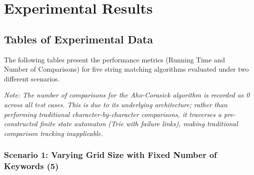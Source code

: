 \section[Experimental Results]{Experimental Results}

\subsection[Experimental Data]{Tables of Experimental Data}
The following tables present the performance metrics (Running Time and Number of Comparisons) for five string matching algorithms evaluated under two different scenarios. 

\vspace{0.3cm}
\noindent\textit{Note: The number of comparisons for the Aho-Corasick algorithm is recorded as 0 across all test cases. This is due to its underlying architecture; rather than performing traditional character-by-character comparisons, it traverses a pre-constructed finite state automaton (Trie with failure links), making traditional comparison tracking inapplicable.}
\vspace{0.3cm}

\subsubsection*{Scenario 1: Varying Grid Size with Fixed Number of Keywords (5)}

\begin{table}[H]
    \centering
    \caption{Running time measurements for Scenario 1}
\end{table}

